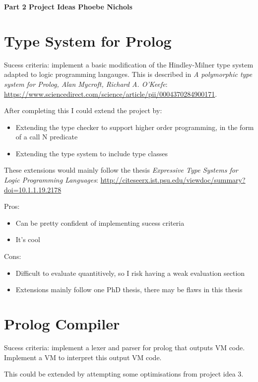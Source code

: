 \documentclass{article}
\begin{document}
\textbf{Part 2 Project Ideas \hfill Phoebe Nichols}
\vspace{1em}

\section{Type System for Prolog}

Sucess criteria: implement a basic modification of the Hindley-Milner type system adapted to logic programming langauges. This is described in \emph{A polymorphic type system for Prolog, Alan Mycroft, Richard A. O'Keefe}: \url{https://www.sciencedirect.com/science/article/pii/0004370284900171}. 

After completing this I could extend the project by:
\begin{itemize}
\item Extending the type checker to support higher order programming, in the form of a call N predicate
\item Extending the type system to include type classes
\end{itemize}

These extensions would mainly follow the thesis \emph{Expressive Type Systems for Logic Programming Languages}: \url{http://citeseerx.ist.psu.edu/viewdoc/summary?doi=10.1.1.19.2178}

Pros:
\begin{itemize}
\item Can be pretty confident of implementing sucess criteria
\item It's cool
\end{itemize}

Cons:
\begin{itemize}
\item Difficult to evaluate quantitively, so I risk having a weak evaluation section
\item Extensions mainly follow one PhD thesis, there may be flaws in this thesis
\end{itemize}


\section{Prolog Compiler}

Sucess criteria: implement a lexer and parser for prolog that outputs VM code. Implement a VM to interpret this output VM code. 

This could be extended by attempting some optimisations from project idea 3.
\end{document}
